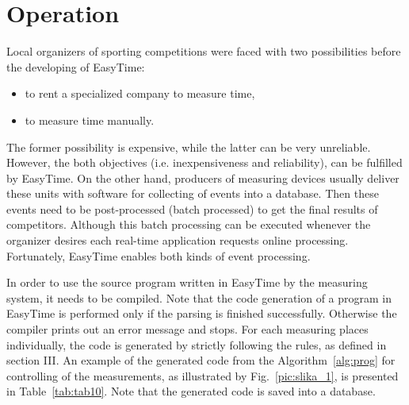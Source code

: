 \documentclass[preprint, prX]{revtex4}
\begin{document}
\section{Operation}

Local organizers of sporting competitions were faced with two possibilities before the developing of EasyTime:
\begin{itemize}
  \item to rent a specialized company to measure time,
  \item to measure time manually.
\end{itemize}
The former possibility is expensive, while the latter can be very unreliable. However, the both objectives (i.e. inexpensiveness and reliability), can be fulfilled by EasyTime. On the other hand, producers of measuring devices usually deliver these units with software for collecting of events into a database. Then these events need to be post-processed (batch processed) to get the final results of competitors. Although this batch processing can be executed whenever the organizer desires each real-time application requests online processing. Fortunately, EasyTime enables both kinds of event processing.

In order to use the source program written in EasyTime by the measuring system, it needs to be compiled. Note that the code
generation \cite{Aho:1972} of a program in EasyTime is performed only if the parsing is finished successfully. Otherwise the compiler
prints out an error message and stops. For each measuring places individually, the code is generated by strictly following the rules, as defined in section III. An example of the generated code from the Algorithm~\ref{alg:prog} for controlling of the measurements,
as illustrated by Fig.~\ref{pic:slika_1}, is presented in Table~\ref{tab:tab10}. Note that the generated code is saved
into a database.
\end{document}
